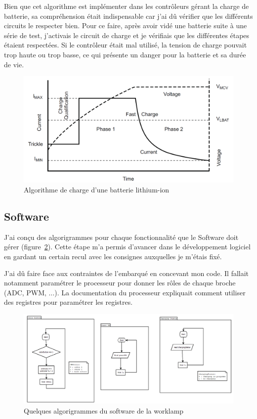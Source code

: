 \documentclass[a4paper, 12pt]{report}
\begin{document}
Bien que cet algorithme est implémenter dans les contrôleurs gérant la charge de batterie, sa compréhension était indispensable car j'ai dû vérifier que les différents circuits le respecter bien. Pour ce faire, après avoir vidé une batterie suite à une série de test, j'activais le circuit de charge et je vérifiais que les différentes étapes étaient respectées. Si le contrôleur était mal utilisé, la tension de charge pouvait trop haute ou trop basse, ce qui présente un danger pour la batterie et sa durée de vie.



\begin{figure}[H]
\centering
\includegraphics[scale=0.65]{figures/screenshots/Li-ion_charge_algortihm.png}
\caption{Algorithme de charge d’une batterie lithium-ion \cite{BQ2000_datasheet}} 
\label{fig:li-ion_charge}
\end{figure}

\subsection{Software}
J'ai conçu des algorigrammes pour chaque fonctionnalité que le Software doit gérer (figure~\ref{fig:flow_chart}). Cette étape m'a permis d'avancer dans le développement logiciel en gardant un certain recul avec les consignes auxquelles je m'étais fixé.

J'ai dû faire face aux contraintes de l'embarqué en concevant mon code. Il fallait notamment paramétrer le processeur pour donner les rôles de chaque broche (ADC, PWM, ...). La documentation du processeur expliquait comment utiliser des registres pour paramétrer les registres. 

\begin{figure}[H]
\centering
\includegraphics[scale=0.7]{figures/screenshots/flow_chart.png}
\caption{Quelques algorigrammes du software de la worklamp} 
\label{fig:flow_chart}
\end{figure}
\end{document}
